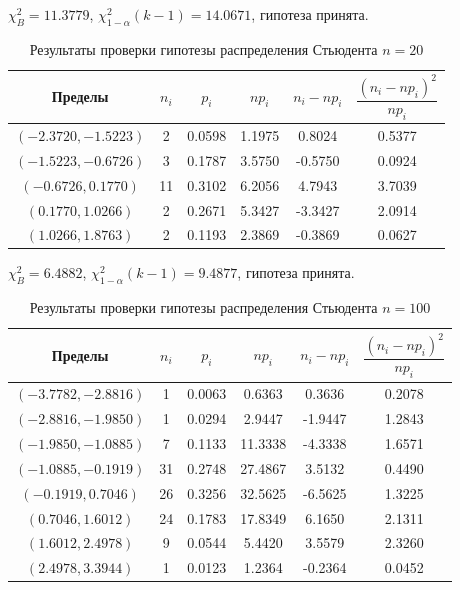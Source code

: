 \documentclass[12pt,a4paper]{article}
\begin{document}
	\( \chi_B^2 = 11.3779 \), \( \chi_{1 - \alpha}^2 (k - 1) = 14.0671 \),
	гипотеза принята.

	\clearpage

	\begin{table}[htbp]
		\centering
		\begin{tabular}{ |c|c|c|c|c|c| }
			\hline
			Пределы & \( n_i \) & \( p_i \) & \( np_i \) & \( n_i - np_i \)
			& \( \dfrac{(n_i - np_i)^2}{np_i} \) \\
			\hline
			\( (-2.3720, -1.5223) \) & 2 & 0.0598 & 1.1975 & 0.8024 & 0.5377 \\
			\hline
			\( (-1.5223, -0.6726) \) & 3 & 0.1787 & 3.5750 & -0.5750 & 0.0924 \\
			\hline
			\( (-0.6726, 0.1770) \) & 11 & 0.3102 & 6.2056 & 4.7943 & 3.7039 \\
			\hline
			\( (0.1770, 1.0266) \) & 2 & 0.2671 & 5.3427 & -3.3427 & 2.0914 \\
			\hline
			\( (1.0266, 1.8763) \) & 2 & 0.1193 & 2.3869 & -0.3869 & 0.0627 \\
			\hline
		\end{tabular}
		\caption{Результаты проверки гипотезы распределения Стьюдента
			\( n = 20 \)}
	\end{table}

	\( \chi_B^2 = 6.4882 \), \( \chi_{1 - \alpha}^2 (k - 1) = 9.4877 \),
	гипотеза принята.

	\begin{table}[htbp]
		\centering
		\begin{tabular}{ |c|c|c|c|c|c| }
			\hline
			Пределы & \( n_i \) & \( p_i \) & \( np_i \) & \( n_i - np_i \)
			& \( \dfrac{(n_i - np_i)^2}{np_i} \) \\
			\hline
			\( (-3.7782, -2.8816) \) & 1 & 0.0063 & 0.6363 & 0.3636 & 0.2078 \\
			\hline
			\( (-2.8816, -1.9850) \) & 1 & 0.0294 & 2.9447 & -1.9447 & 1.2843 \\
			\hline
			\( (-1.9850, -1.0885) \) & 7 & 0.1133 & 11.3338 & -4.3338 & 1.6571 \\
			\hline
			\( (-1.0885, -0.1919) \) & 31 & 0.2748 & 27.4867 & 3.5132 & 0.4490 \\
			\hline
			\( (-0.1919, 0.7046) \) & 26 & 0.3256 & 32.5625 & -6.5625 & 1.3225 \\
			\hline
			\( (0.7046, 1.6012) \) & 24 & 0.1783 & 17.8349 & 6.1650 & 2.1311 \\
			\hline
			\( (1.6012, 2.4978) \) & 9 & 0.0544 & 5.4420 & 3.5579 & 2.3260 \\
			\hline
			\( (2.4978, 3.3944) \) & 1 & 0.0123 & 1.2364 & -0.2364 & 0.0452 \\
			\hline
		\end{tabular}
		\caption{Результаты проверки гипотезы распределения Стьюдента
			\( n = 100 \)}
	\end{table}
\end{document}
